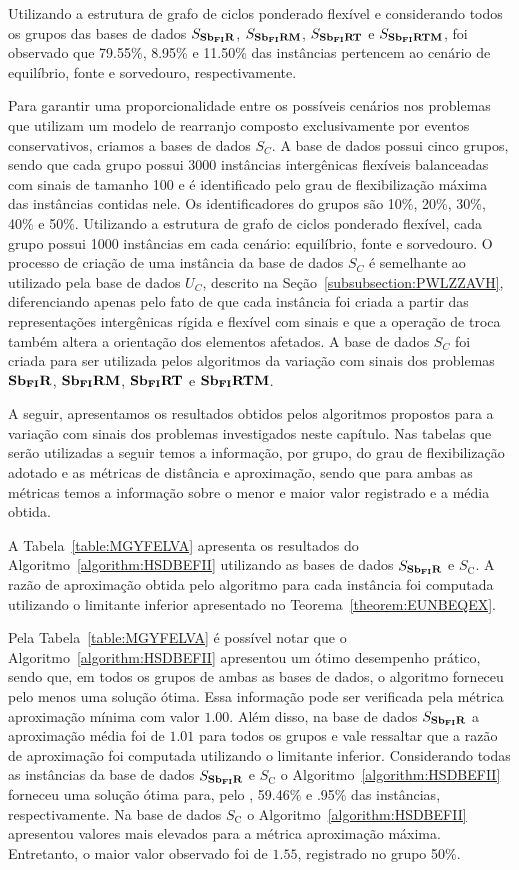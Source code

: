 Utilizando a estrutura de grafo de ciclos ponderado flexível e considerando todos os grupos das bases de dados $S_{\textbf{Sb\textsubscript{FI}R}}{}$, $S_{\textbf{Sb\textsubscript{FI}RM}}{}$, $S_{\textbf{Sb\textsubscript{FI}RT}}{}$ e $S_{\textbf{Sb\textsubscript{FI}RTM}}{}$, foi observado que 79.55\%,  8.95\% e 11.50\% das instâncias pertencem ao cenário de equilíbrio, fonte e sorvedouro, respectivamente. 

Para garantir uma proporcionalidade entre os possíveis cenários nos problemas que utilizam um modelo de rearranjo composto exclusivamente por eventos conservativos, criamos a bases de dados $S_{C}$. A base de dados possui cinco grupos, sendo que cada grupo possui 3000 instâncias intergênicas flexíveis balanceadas com sinais de tamanho 100 e é identificado pelo grau de flexibilização máxima das instâncias contidas nele. Os identificadores do grupos são 10\%, 20\%, 30\%, 40\% e 50\%. Utilizando a estrutura de grafo de ciclos ponderado flexível, cada grupo possui 1000 instâncias em cada cenário: equilíbrio, fonte e sorvedouro. O processo de criação de uma instância da base de dados $S_{C}$ é semelhante ao utilizado pela base de dados $U_{C}$, descrito na Seção~\ref{subsubsection:PWLZZAVH}, diferenciando apenas pelo fato de que cada instância foi criada a partir das representações intergênicas rígida e flexível com sinais e que a operação de troca também altera a orientação dos elementos afetados. A base de dados $S_{C}$ foi criada para ser utilizada pelos algoritmos da variação com sinais dos problemas $\textbf{Sb\textsubscript{FI}R}{}$, $\textbf{Sb\textsubscript{FI}RM}{}$, $\textbf{Sb\textsubscript{FI}RT}{}$ e $\textbf{Sb\textsubscript{FI}RTM}{}$.

A seguir, apresentamos os resultados obtidos pelos algoritmos propostos para a variação com sinais dos problemas investigados neste capítulo. Nas tabelas que serão utilizadas a seguir temos a informação, por grupo, do grau de flexibilização adotado e as métricas de distância e aproximação, sendo que para ambas as métricas temos a informação sobre o menor e maior valor registrado e a média obtida.

A Tabela~\ref{table:MGYFELVA} apresenta os resultados do Algoritmo~\ref{algorithm:HSDBEFII} utilizando as bases de dados $S_{\textbf{Sb\textsubscript{FI}R}}{}$ e $S_{\text{C}}$. A razão de aproximação obtida pelo algoritmo para cada instância foi computada utilizando o limitante inferior apresentado no Teorema~\ref{theorem:EUNBEQEX}.



Pela Tabela~\ref{table:MGYFELVA} é possível notar que o Algoritmo~\ref{algorithm:HSDBEFII} apresentou um ótimo desempenho prático, sendo que, em todos os grupos de ambas as bases de dados, o algoritmo forneceu pelo menos uma solução ótima. Essa informação pode ser verificada pela métrica aproximação mínima com valor $1.00$. Além disso, na base de dados $S_{\textbf{Sb\textsubscript{FI}R}}{}$ a aproximação média foi de $1.01$ para todos os grupos e vale ressaltar que a razão de aproximação foi computada utilizando o limitante inferior. Considerando todas as instâncias da base de dados $S_{\textbf{Sb\textsubscript{FI}R}}{}$ e $S_{\text{C}}$ o Algoritmo~\ref{algorithm:HSDBEFII} forneceu uma solução ótima para, pelo , 59.46\% e .95\% das instâncias, respectivamente. Na base de dados $S_{\text{C}}$ o Algoritmo~\ref{algorithm:HSDBEFII} apresentou valores mais elevados para a métrica aproximação máxima. Entretanto, o maior valor observado foi de $1.55$, registrado no grupo 50\%.

